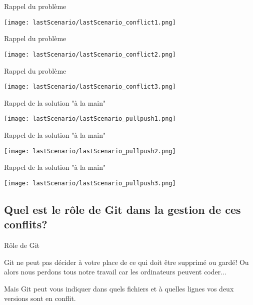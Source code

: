 \documentclass{beamer}
\begin{document}
\begin{frame}{Rappel du problème}
\begin{center}
    \texttt{[image: lastScenario/lastScenario\_conflict1.png]}
\end{center}
\end{frame}

\begin{frame}{Rappel du problème}
\begin{center}
    \texttt{[image: lastScenario/lastScenario\_conflict2.png]}
\end{center}
\end{frame}

\begin{frame}{Rappel du problème}
\begin{center}
    \texttt{[image: lastScenario/lastScenario\_conflict3.png]}
\end{center}
\end{frame}

\begin{frame}{Rappel de la solution "à la main"}
\begin{center}
    \texttt{[image: lastScenario/lastScenario\_pullpush1.png]}
\end{center}
\end{frame}

\begin{frame}{Rappel de la solution "à la main"}
\begin{center}
    \texttt{[image: lastScenario/lastScenario\_pullpush2.png]}
\end{center}
\end{frame}

\begin{frame}{Rappel de la solution "à la main"}
\begin{center}
    \texttt{[image: lastScenario/lastScenario\_pullpush3.png]}
\end{center}
\end{frame}


\subsection{Quel est le rôle de Git dans la gestion de ces conflits?}
\begin{frame}{Rôle de Git}

Git ne peut pas décider à votre place de ce qui doit être supprimé ou gardé! Ou alors nous perdons tous notre travail car les ordinateurs peuvent coder...\\
\medskip

Mais Git peut vous indiquer dans quels fichiers et à quelles lignes vos deux versions sont en conflit. 
    
\end{frame}
\end{document}
